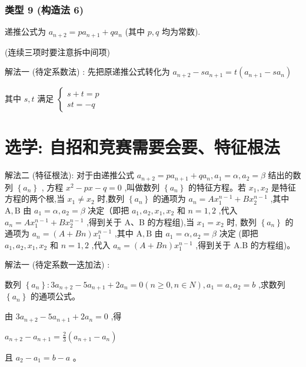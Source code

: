 \documentclass[10pt,cn]{elegantbook}
\begin{document}
\section{类型 9 (构造法 6) }递推公式为 \({a}_{n + 2} = p{a}_{n + 1} + q{a}_{n}\) (其中 \(p,q\) 均为常数).

(连续三项时要注意拆中间项)

解法一 (待定系数法) : 先把原递推公式转化为 \({a}_{n + 2} - s{a}_{n + 1} = t\left( {{a}_{n + 1} - s{a}_{n}}\right)\)

其中 \(s,t\) 满足 \(\left\{ \begin{array}{l} s + t = p \\ {st} = - q \end{array}\right.\)

\part{选学: 自招和竞赛需要会要、特征根法}

解法二 (特征根法): 对于由递推公式 \({a}_{n + 2} = p{a}_{n + 1} + q{a}_{n},{a}_{1} = \alpha ,{a}_{2} = \beta\) 结出的数列 \(\left\{ {a}_{n}\right\}\) , 方程 \({x}^{2} - {px} - q = 0\) ,叫做数列 \(\left\{ {a}_{n}\right\}\) 的特征方程。若 \({x}_{1},{x}_{2}\) 是特征方程的两个根,当 \({x}_{1} \neq {x}_{2}\) 时,数列 \(\left\{ {a}_{n}\right\}\) 的通项为 \({a}_{n} = A{x}_{1}^{n - 1} + B{x}_{2}^{n - 1}\) ,其中 \(\mathrm{A},\mathrm{B}\) 由 \({a}_{1} = \alpha ,{a}_{2} = \beta\) 决定（即把 \({a}_{1},{a}_{2},{x}_{1},{x}_{2}\) 和 \(n = 1,2\) ,代入 \({a}_{n} = A{x}_{1}^{n - 1} + B{x}_{2}^{n - 1}\) ,得到关于 A、B 的方程组),当 \({x}_{1} = {x}_{2}\) 时, 数列 \(\left\{ {a}_{n}\right\}\) 的通项为 \({a}_{n} = \left( {A + {Bn}}\right) {x}_{1}^{n - 1}\) ,其中 \(\mathrm{A},\mathrm{B}\) 由 \({a}_{1} = \alpha ,{a}_{2} = \beta\) 决定 (即把 \({a}_{1},{a}_{2},{x}_{1},{x}_{2}\) 和 \(n = 1,2\) ,代入 \({a}_{n} = \left( {A + {Bn}}\right) {x}_{1}^{n - 1}\) ,得到关于 A.B 的方程组)。

解法一 (待定系数一迭加法) :

数列 \(\left\{ {a}_{n}\right\} : 3{a}_{n + 2} - 5{a}_{n + 1} + 2{a}_{n} = 0\left( {n \geq 0,n \in N}\right) ,{a}_{1} = a,{a}_{2} = b\) ,求数列 \(\left\{ {a}_{n}\right\}\) 的通项公式。

由 \(3{a}_{n + 2} - 5{a}_{n + 1} + 2{a}_{n} = 0\) ,得

\({a}_{n + 2} - {a}_{n + 1} = \frac{2}{3}\left( {{a}_{n + 1} - {a}_{n}}\right)\)

且 \({a}_{2} - {a}_{1} = b - a\) 。
\end{document}
